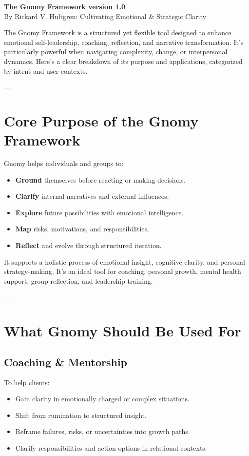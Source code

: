 \documentclass{article}
\begin{document}
\begin{center}
    \textbf{\Huge The Gnomy Framework version 1.0} \\\large By Rickard V. Hultgren: Cultivating Emotional \& Strategic Clarity
\end{center}

\justify
The Gnomy Framework is a structured yet flexible tool designed to enhance emotional self-leadership, coaching, reflection, and narrative transformation. It's particularly powerful when navigating complexity, change, or interpersonal dynamics. Here's a clear breakdown of its purpose and applications, categorized by intent and user contexts.

---

\section{Core Purpose of the Gnomy Framework}
Gnomy helps individuals and groups to:
\begin{itemize}[noitemsep,topsep=0pt]
    \item \textbf{Ground} themselves before reacting or making decisions.
    \item \textbf{Clarify} internal narratives and external influences.
    \item \textbf{Explore} future possibilities with emotional intelligence.
    \item \textbf{Map} risks, motivations, and responsibilities.
    \item \textbf{Reflect} and evolve through structured iteration.
\end{itemize}
It supports a holistic process of emotional insight, cognitive clarity, and personal strategy-making. It's an ideal tool for coaching, personal growth, mental health support, group reflection, and leadership training.

---

\section{What Gnomy Should Be Used For}

\subsection{Coaching \& Mentorship}
To help clients:
\begin{itemize}[noitemsep,topsep=0pt]
    \item Gain clarity in emotionally charged or complex situations.
    \item Shift from rumination to structured insight.
    \item Reframe failures, risks, or uncertainties into growth paths.
    \item Clarify responsibilities and action options in relational contexts.
\end{itemize}
\end{document}
